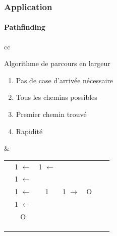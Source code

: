 	\begin{frame}
	\frametitle{Application}
	\framesubtitle{Pathfinding}
	
		\begin{tabular}{cc}
			\begin{minipage}{5cm}
				Algorithme de parcours en largeur
				\begin{enumerate}
					\item Pas de case d'arrivée nécessaire
					\item Tous les chemins possibles
					\item Premier chemin trouvé
					\item Rapidité
				\end{enumerate}
			\end{minipage} &
			\begin{minipage}{5cm}
							\begin{center}
				\begin{tabular}{|c|c|c|c|c|c|c|} \hline
				\rowcolor{gray}  &  &                    &  &                  &  &                   \\\hline
				\cellcolor{gray} & \cellcolor{orange}1 $\leftarrow$ & \cellcolor{green}1 $\leftarrow$                   &&                && \cellcolor{gray} \\\hline
				\cellcolor{gray} & \cellcolor{orange}1 $\leftarrow$ & \cellcolor{gray}   & \cellcolor{gray} & \cellcolor{gray} &&	\cellcolor{gray} \\\hline
				\cellcolor{gray} & \cellcolor{orange}1 $\leftarrow$ & \cellcolor{orange}1 & \cellcolor{orange}1 $\rightarrow$ & \cellcolor{red}O                 && \cellcolor{gray} \\\hline
				\cellcolor{gray} & \cellcolor{orange}1 $\leftarrow$ & \cellcolor{gray}   & \cellcolor{gray} & \cellcolor{gray} && \cellcolor{gray} \\\hline
				\cellcolor{gray} & \cellcolor{red}O &                  &  &                && \cellcolor{gray} \\\hline
				\cellcolor{gray} && \cellcolor{gray}   && \cellcolor{gray} &&	\cellcolor{gray} \\\hline
				\cellcolor{gray} &&                  &&                && \cellcolor{gray} \\\hline
				\rowcolor{gray}  &  &                    &  &                  &  & \\\hline
				\end{tabular}
			\end{center}
			\end{minipage}\\
		\end{tabular}	
	
	\end{frame}
	
